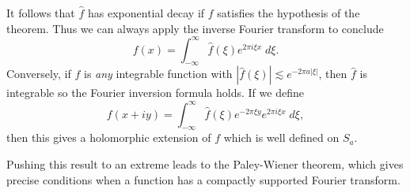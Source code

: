 It follows that $\widehat{f}$ has exponential decay if $f$ satisfies the hypothesis of the theorem. Thus we can always apply the inverse Fourier transform to conclude
%
\[ f(x) = \int_{-\infty}^\infty \widehat{f}(\xi) e^{2 \pi i \xi x}\; d\xi. \]
%
Conversely, if $f$ is \emph{any} integrable function with $|\widehat{f}(\xi)| \lesssim e^{-2 \pi a |\xi|}$, then $\widehat{f}$ is integrable so the Fourier inversion formula holds. If we define
%
\[ f(x + iy) = \int_{-\infty}^\infty \widehat{f}(\xi) e^{-2 \pi \xi y} e^{2 \pi i \xi x}\; d\xi, \]
%
then this gives a holomorphic extension of $f$ which is well defined on $S_a$.

Pushing this result to an extreme leads to the Paley-Wiener theorem, which gives precise conditions when a function has a compactly supported Fourier transform.

